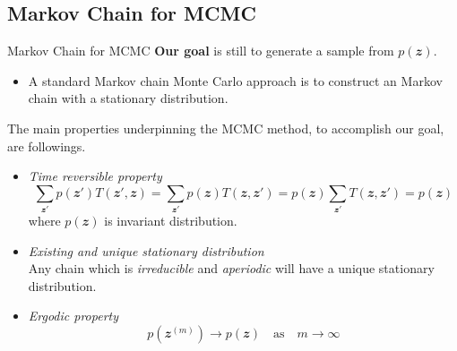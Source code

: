 \documentclass{bredelebeamer}
\begin{document}
\subsection{Markov Chain for MCMC}
\begin{frame}{Markov Chain for MCMC}
  \textbf{Our goal} is still to generate a sample from $p(\mathbfit{z})$.
  \begin{itemize}
    \item A standard Markov chain Monte Carlo approach is to construct
    an  Markov chain with a stationary distribution.
  \end{itemize}
  The main properties underpinning the MCMC method, to accomplish our goal,
  are followings.
  \begin{itemize}
    \item \textit{Time reversible property}
    \begin{equation}
      \sum_{\mathbfit{z}'} p(\mathbfit{z}') T(\mathbfit{z}',\mathbfit{z})
      = \sum_{\mathbfit{z}'} p(\mathbfit{z}) T(\mathbfit{z},\mathbfit{z}')
      = p(\mathbfit{z}) \sum_{\mathbfit{z}'} T(\mathbfit{z},\mathbfit{z}')
      = p(\mathbfit{z})
    \end{equation}
    where $p(\mathbfit{z})$ is invariant distribution.

    \item \textit{Existing and unique stationary distribution} \\
    Any chain which is \textit{irreducible} and \textit{aperiodic} will
    have a unique stationary distribution.

    \item \textit{Ergodic property}
    \begin{equation}
      p(\mathbfit{z}^{(m)}) \rightarrow p(\mathbfit{z})
      \quad \textrm{as} \quad
      m \rightarrow \infty
    \end{equation}
  \end{itemize}
\end{frame}
\end{document}
